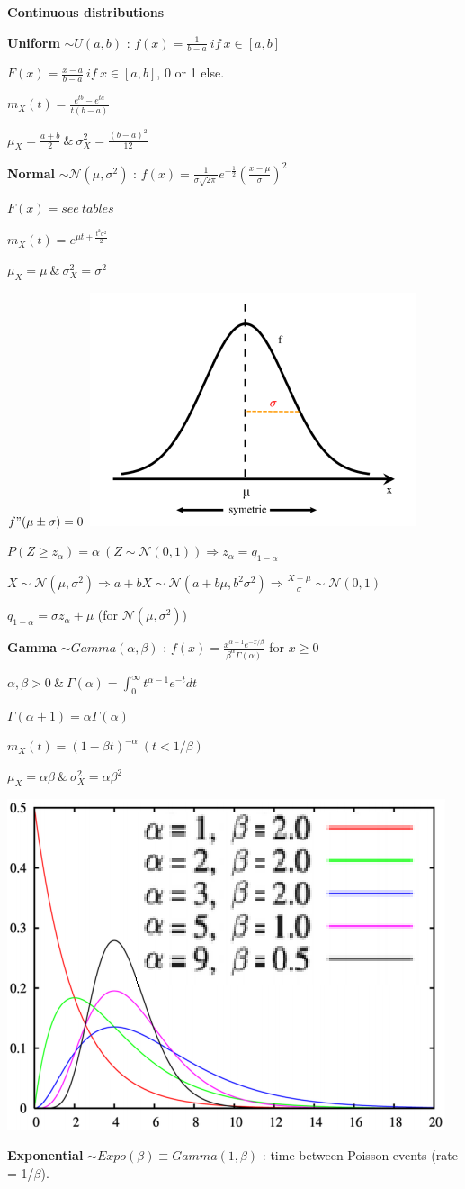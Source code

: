\documentclass[a4paper,10.5pt]{article}
\begin{document}
\begin{multicols}{4}
		\textbf{Continuous distributions}
		
		\textbf{Uniform} $\sim U(a,b)$ : $f(x) = \frac{1}{b-a}\ if\ x\in [a,b]$
		
		$F(x) = \frac{x-a}{b-a}\ if\ x\in [a,b]$, 0 or 1 else.
		
		$m_X(t) = \frac{e^{tb}-e^{ta}}{t(b-a)}$
		
		$\mu_X = \frac{a+b}{2}\ \&\ \sigma_X^2 = \frac{(b-a)^2}{12}$
		
		\textbf{Normal} $\sim \mathcal{N}(\mu,\sigma^2)$ : $f(x) = \frac{1}{\sigma \sqrt{2\pi}}e^{-\frac{1}{2}}(\frac{x-\mu}{\sigma})^2$
		
		$F(x) = see\ tables$
		
		$m_X(t) = e^{\mu t + \frac{t^2\sigma^2}{2}}$
		
		$\mu_X = \mu\ \&\ \sigma_X^2 = \sigma^2$
		
		$f"(\mu\pm\sigma) = 0$ \includegraphics[width=1 cm]{img/normal.PNG}
		
		$P(Z\geq z_\alpha) = \alpha\ (Z \sim \mathcal{N}(0,1)) \Rightarrow z_\alpha = q_{1-\alpha}$
		
		$X \sim \mathcal{N}(\mu, \sigma^2) \Rightarrow a+bX \sim \mathcal{N}(a+b\mu,b^2\sigma^2) \Rightarrow \frac{X-\mu}{\sigma} \sim \mathcal{N}(0,1)$
		
		$q_{1-\alpha} = \sigma z_\alpha + \mu$ (for $\mathcal{N}(\mu,\sigma^2)$)
		
		\textbf{Gamma} $\sim Gamma(\alpha,\beta)$ : $f(x) = \frac{x^{\alpha-1}e^{-x/\beta}}{\beta^\alpha \Gamma(\alpha)}$ for $x \geq 0$
		
		$\alpha,\beta > 0\ \&\ \Gamma(\alpha) = \int_0^\infty t^{\alpha-1}e^{-t} dt$
		
		$\Gamma(\alpha+1) = \alpha \Gamma(\alpha)$
		
		$m_X(t) = (1-\beta t)^{-\alpha}\ (t<1/\beta)$
		
		$\mu_X = \alpha\beta\ \&\ \sigma_X^2 = \alpha\beta^2$
		
		\includegraphics[width=3 cm]{img/gamma.PNG}
		
		\textbf{Exponential} $\sim Expo(\beta) \equiv Gamma(1,\beta)$ : time between Poisson events (rate = 1/$\beta$).
		

\end{multicols}
\end{document}

